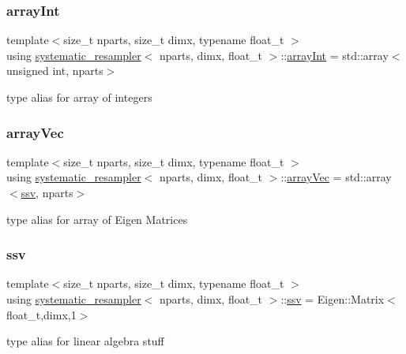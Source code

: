 \subsubsection{\texorpdfstring{array\+Int}{arrayInt}}
{\footnotesize\ttfamily template$<$size\+\_\+t nparts, size\+\_\+t dimx, typename float\+\_\+t $>$ \\
using \hyperlink{classsystematic__resampler}{systematic\+\_\+resampler}$<$ nparts, dimx, float\+\_\+t $>$\+::\hyperlink{classsystematic__resampler_afbdf5779938dfee726f87d31040284de}{array\+Int} =  std\+::array$<$unsigned int, nparts$>$}

type alias for array of integers \mbox{\label{classsystematic__resampler_a89263b385b61687341d67a717da78dc1}} 
\subsubsection{\texorpdfstring{array\+Vec}{arrayVec}}
{\footnotesize\ttfamily template$<$size\+\_\+t nparts, size\+\_\+t dimx, typename float\+\_\+t $>$ \\
using \hyperlink{classsystematic__resampler}{systematic\+\_\+resampler}$<$ nparts, dimx, float\+\_\+t $>$\+::\hyperlink{classrbase_aa12fc826befa6ba0647b5f59ebc396ee}{array\+Vec} =  std\+::array$<$\hyperlink{classrbase_ae20e0b8df15aa109252f57ecbf1f20f8}{ssv}, nparts$>$}

type alias for array of Eigen Matrices \mbox{\label{classsystematic__resampler_a9e158fbf5875f93e9cb4da562928e649}} 
\subsubsection{\texorpdfstring{ssv}{ssv}}
{\footnotesize\ttfamily template$<$size\+\_\+t nparts, size\+\_\+t dimx, typename float\+\_\+t $>$ \\
using \hyperlink{classsystematic__resampler}{systematic\+\_\+resampler}$<$ nparts, dimx, float\+\_\+t $>$\+::\hyperlink{classrbase_ae20e0b8df15aa109252f57ecbf1f20f8}{ssv} =  Eigen\+::\+Matrix$<$float\+\_\+t,dimx,1$>$}

type alias for linear algebra stuff 

